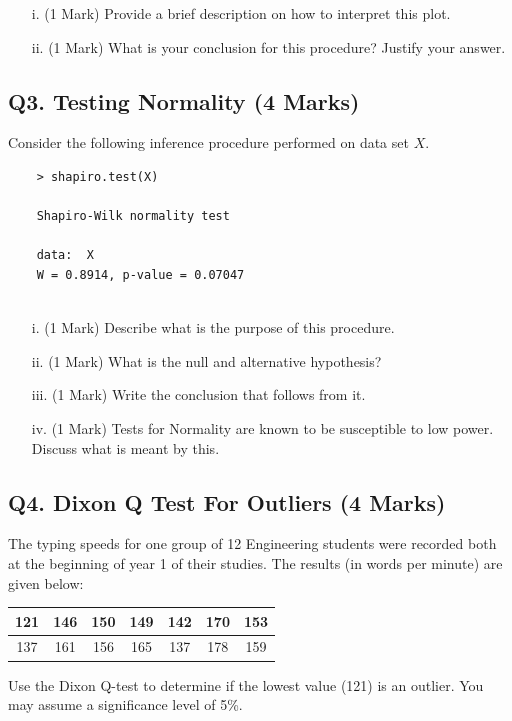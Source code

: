 \documentclass[a4paper,12pt]{article}
\begin{document}
\begin{itemize}
	\item[i.] (1 Mark) Provide a brief description on how to interpret this plot.
	\item[ii.] (1 Mark) What is your conclusion for this procedure? Justify your answer.
\end{itemize}

\subsection*{Q3. Testing Normality (4 Marks)} %
Consider the following inference procedure performed on data set $X$.
\begin{center}
	\begin{verbatim}
	> shapiro.test(X)
	
	Shapiro-Wilk normality test
	
	data:  X
	W = 0.8914, p-value = 0.07047
	
	\end{verbatim}
\end{center}


\begin{itemize}
	\item[i.] (1 Mark) Describe what is the purpose of this procedure.
	\item[ii.] (1 Mark) What is the null and alternative hypothesis?
	\item[iii.] (1 Mark) Write the conclusion that follows from it.
	\item[iv.] (1 Mark) Tests for Normality are known to be susceptible to low power. Discuss what is meant by this.
\end{itemize}


\subsection*{Q4. Dixon Q Test For Outliers (4 Marks)}

The typing speeds for one group of 12 Engineering students were recorded both at the beginning of year 1 of their studies. The results (in words per minute) are given below:

\begin{center}
	\begin{tabular}{|c|c|c|c|c|c|c|}
		\hline
		121 & 146 & 150 &149 &142 &170& 153\\ \hline
		137 & 161 & 156& 165& 137& 178& 159
		\\ \hline
	\end{tabular}
\end{center}
Use the Dixon Q-test to determine if the lowest value (121) is an outlier. You may assume a significance level of 5\%.
\end{document}
